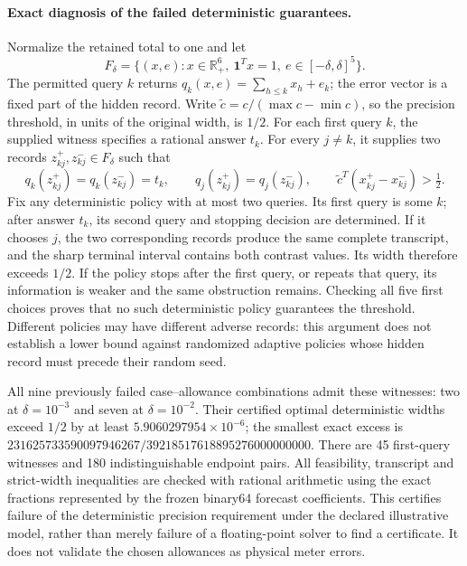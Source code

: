 \paragraph{Exact diagnosis of the failed deterministic guarantees.}
Normalize the retained total to one and let
\[
 F_\delta=\{(x,e):x\in\mathbb R_+^6,\ \mathbf1^Tx=1,
                         \ e\in[-\delta,\delta]^5\}.
\]
The permitted query $k$ returns $q_k(x,e)=\sum_{h\le k}x_h+e_k$;
the error vector is a fixed part of the hidden record.
Write $\widetilde c=c/(\max c-\min c)$, so the precision threshold,
in units of the original width, is $1/2$.
For each first query $k$, the supplied witness specifies a rational answer $t_k$.
For every $j\ne k$, it supplies two records $z_{kj}^+,z_{kj}^-\in F_\delta$
such that
\[
 q_k(z_{kj}^+)=q_k(z_{kj}^-)=t_k,\qquad
 q_j(z_{kj}^+)=q_j(z_{kj}^-),\qquad
 \widetilde c^T(x_{kj}^+-x_{kj}^-)>\tfrac12.
\]
Fix any deterministic policy with at most two queries. Its first query is some
$k$; after answer $t_k$, its second query and stopping decision are determined.
If it chooses $j$, the two corresponding records produce the same complete
transcript, and the sharp terminal interval contains both contrast values.
Its width therefore exceeds $1/2$. If the policy stops after the first query,
or repeats that query, its information is weaker and the same obstruction
remains. Checking all five first choices proves that no such deterministic
policy guarantees the threshold. Different policies may have different
adverse records: this argument does not establish a lower bound against
randomized adaptive policies whose hidden record must precede their random seed.

All nine previously failed case--allowance combinations admit these witnesses:
two at $\delta=10^{-3}$ and seven at $\delta=10^{-2}$.
Their certified optimal deterministic widths exceed $1/2$ by at least
$5.9060297954\times10^{-6}$; the smallest exact excess is
$231625733590097946267/39218517618895276000000000$.
There are 45 first-query witnesses and 180 indistinguishable endpoint pairs.
All feasibility, transcript and strict-width inequalities are checked with
rational arithmetic using the exact fractions represented by the frozen
binary64 forecast coefficients. This certifies failure of the deterministic
precision requirement under the declared illustrative model, rather than
merely failure of a floating-point solver to find a certificate. It does not
validate the chosen allowances as physical meter errors.
